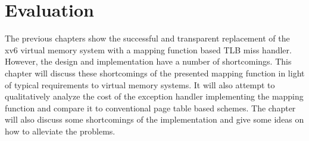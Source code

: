 \chapter{Evaluation}
\label{chap:eval}










The previous chapters show the successful and transparent replacement of the xv6 virtual memory system with a mapping function based TLB miss handler. However, the design and implementation have a number of shortcomings.
This chapter will discuss these shortcomings of the presented mapping function in light of typical requirements to virtual memory systems. It will also attempt to qualitatively analyze the cost of the exception handler implementing the mapping function and compare it to conventional page table based schemes. The chapter will also discuss some shortcomings of the implementation and give some ideas on how to alleviate the problems.

